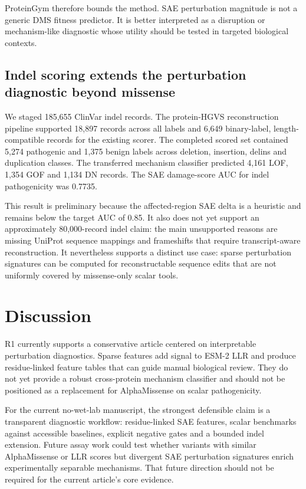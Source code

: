 \documentclass[pdflatex,sn-nature]{sn-jnl}
\begin{document}
ProteinGym therefore bounds the method. SAE perturbation magnitude is not a generic DMS fitness predictor. It is better interpreted as a disruption or mechanism-like diagnostic whose utility should be tested in targeted biological contexts.

\subsection{Indel scoring extends the perturbation diagnostic beyond missense}

We staged 185,655 ClinVar indel records. The protein-HGVS reconstruction pipeline supported 18,897 records across all labels and 6,649 binary-label, length-compatible records for the existing scorer. The completed scored set contained 5,274 pathogenic and 1,375 benign labels across deletion, insertion, delins and duplication classes. The transferred mechanism classifier predicted 4,161 LOF, 1,354 GOF and 1,134 DN records. The SAE damage-score AUC for indel pathogenicity was 0.7735.

This result is preliminary because the affected-region SAE delta is a heuristic and remains below the target AUC of 0.85. It also does not yet support an approximately 80,000-record indel claim: the main unsupported reasons are missing UniProt sequence mappings and frameshifts that require transcript-aware reconstruction. It nevertheless supports a distinct use case: sparse perturbation signatures can be computed for reconstructable sequence edits that are not uniformly covered by missense-only scalar tools.

\section{Discussion}\label{sec:discussion}

R1 currently supports a conservative article centered on interpretable perturbation diagnostics. Sparse features add signal to ESM-2 LLR and produce residue-linked feature tables that can guide manual biological review. They do not yet provide a robust cross-protein mechanism classifier and should not be positioned as a replacement for AlphaMissense on scalar pathogenicity.

For the current no-wet-lab manuscript, the strongest defensible claim is a transparent diagnostic workflow: residue-linked SAE features, scalar benchmarks against accessible baselines, explicit negative gates and a bounded indel extension. Future assay work could test whether variants with similar AlphaMissense or LLR scores but divergent SAE perturbation signatures enrich experimentally separable mechanisms. That future direction should not be required for the current article's core evidence.
\end{document}
